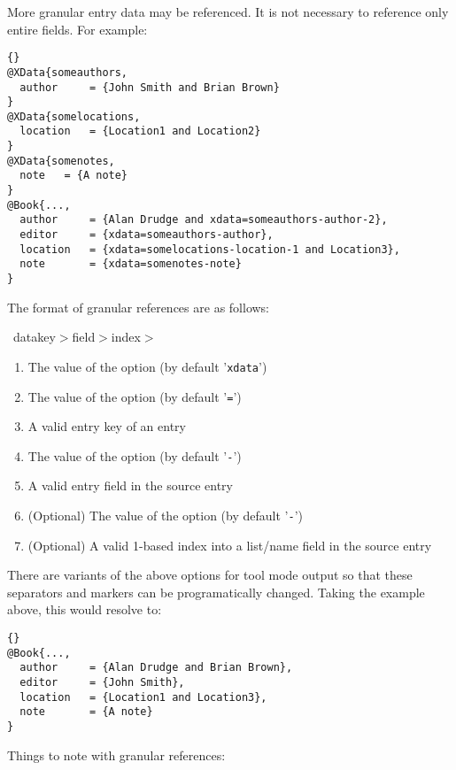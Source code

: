 More granular  entry data may be referenced. It is not necessary to reference only entire fields. For example:

\begin{lstlisting}[style=bibtex]{}
@XData{someauthors,
  author     = {John Smith and Brian Brown}
}
@XData{somelocations,
  location   = {Location1 and Location2}
}
@XData{somenotes,
  note   = {A note}
}
@Book{...,
  author     = {Alan Drudge and xdata=someauthors-author-2},
  editor     = {xdata=someauthors-author},
  location   = {xdata=somelocations-location-1 and Location3},
  note       = {xdata=somenotes-note}
}
\end{lstlisting}
%
The format of granular  references are as follows:

\begin{namesample}
\item~datakey$>$field$>$index$>$
\end{namesample}

\begin{enumerate}
  \item The value of the \biber option  (by default '\texttt{xdata}')
  \item The value of the \biber option  (by default '\texttt{=}')
  \item A valid entry key of an  entry
  \item The value of the \biber option  (by default '\texttt{-}')
  \item A valid entry field in the source  entry
  \item (Optional) The value of the \biber option  (by default '\texttt{-}')
  \item (Optional) A valid 1-based index into a list/name field in the source  entry
\end{enumerate}
%
There are  variants of the above options for \biber tool mode output so that these separators and markers can be programatically changed. Taking the example above, this  would resolve to:

\begin{lstlisting}[style=bibtex]{}
@Book{...,
  author     = {Alan Drudge and Brian Brown},
  editor     = {John Smith},
  location   = {Location1 and Location3},
  note       = {A note}
}
\end{lstlisting}
%
Things to note with granular  references:

